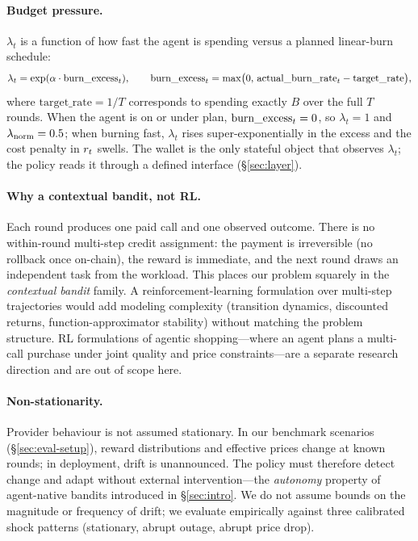 \paragraph{Budget pressure.}
$\lambda_t$ is a function of how fast the agent is spending versus a planned linear-burn schedule:
\begin{equation}
\label{eq:lambda}
\lambda_t = \exp(\alpha \cdot \mathrm{burn\_excess}_t), \qquad
\mathrm{burn\_excess}_t = \max\!\big(0,\,\mathrm{actual\_burn\_rate}_t - \mathrm{target\_rate}\big),
\end{equation}
where $\mathrm{target\_rate} = 1/T$ corresponds to spending exactly $B$ over the full $T$ rounds. When the agent is on or under plan, $\mathrm{burn\_excess}_t = 0$, so $\lambda_t = 1$ and $\lambda_{\mathrm{norm}} = 0.5$; when burning fast, $\lambda_t$ rises super-exponentially in the excess and the cost penalty in $r_t$ swells. The wallet is the only stateful object that observes $\lambda_t$; the policy reads it through a defined interface (\S\ref{sec:layer}).

\paragraph{Why a contextual bandit, not RL.}
Each round produces one paid call and one observed outcome. There is no within-round multi-step credit assignment: the payment is irreversible (no rollback once on-chain), the reward is immediate, and the next round draws an independent task from the workload. This places our problem squarely in the \emph{contextual bandit} family. A reinforcement-learning formulation over multi-step trajectories would add modeling complexity (transition dynamics, discounted returns, function-approximator stability) without matching the problem structure. RL formulations of agentic shopping---where an agent plans a multi-call purchase under joint quality and price constraints---are a separate research direction and are out of scope here.

\paragraph{Non-stationarity.}
Provider behaviour is not assumed stationary. In our benchmark scenarios (\S\ref{sec:eval-setup}), reward distributions and effective prices change at known rounds; in deployment, drift is unannounced. The policy must therefore detect change and adapt without external intervention---the \emph{autonomy} property of agent-native bandits introduced in \S\ref{sec:intro}. We do not assume bounds on the magnitude or frequency of drift; we evaluate empirically against three calibrated shock patterns (stationary, abrupt outage, abrupt price drop).

